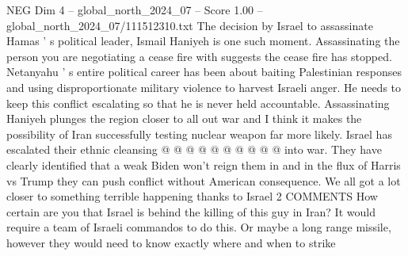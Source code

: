 \begin{textsample}{NEG Dim 4 – global\_north\_2024\_07 – Score 1.00 – global\_north\_2024\_07/111512310.txt}
The decision by Israel to assassinate Hamas ' s political leader, Ismail Haniyeh is one such moment.
Assassinating the person you are negotiating a cease fire with suggests the cease fire has stopped.
Netanyahu ' s entire political career has been about baiting Palestinian responses and using disproportionate military violence to harvest Israeli anger.
He needs to keep this conflict escalating so that he is never held accountable.
Assassinating Haniyeh plunges the region closer to all out war and I think it makes the possibility of Iran successfully testing nuclear weapon far more likely.
Israel has escalated their ethnic cleansing @ @ @ @ @ @ @ @ @ @ into war.
They have clearly identified that a weak Biden won't reign them in and in the flux of Harris vs Trump they can push conflict without American consequence.
We all got a lot closer to something terrible happening thanks to Israel 2 COMMENTS How certain are you that Israel is behind the killing of this guy in Iran?
It would require a team of Israeli commandos to do this.
Or maybe a long range missile, however they would need to know exactly where and when to strike

\end{textsample}
